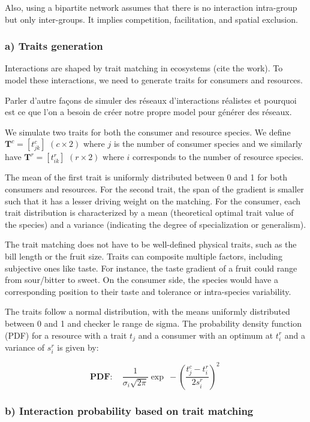 Also, using a bipartite network assumes that there is no interaction intra-group but only inter-groups. It implies competition, facilitation, and spatial exclusion.




\subsubsection{a) Traits generation}

Interactions are shaped by trait matching in ecosystems (cite the work). To model these interactions, we need to generate traits for consumers and resources.

Parler d'autre façons de simuler des réseaux d'interactions réalistes et pourquoi est ce que l'on a besoin de créer notre propre model pour générer des réseaux.

We simulate two traits for both the consumer and resource species. We define $\mathbf{T}^c = [t^c_{jk}]$ $(c \times 2)$ where $j$ is the number of consumer species and we similarly have $\mathbf{T}^r = [t^r_{ik}]$ $(r \times 2)$ where $i$ corresponds to the number of resource species.

The mean of the first trait is uniformly distributed between 0 and 1 for both consumers and resources. For the second trait, the span of the gradient is smaller such that it has a lesser  driving weight on the matching.
For the consumer, each trait distribution is characterized by a mean (theoretical optimal trait value of the species) and a variance (indicating the degree of specialization or generalism).

The trait matching does not have to be well-defined physical traits, such as the bill length or the fruit size. Traits can composite multiple factors, including subjective ones like taste. For instance, the taste gradient of a fruit could range from sour/bitter to sweet. On the consumer side, the species would have a corresponding position to their taste and tolerance or intra-species variability.

The traits follow a normal distribution, with the means uniformly distributed between 0 and 1 and checker le range de sigma. The probability density function (PDF) for a resource with a trait $t_j$ and a consumer with an optimum at $t_i^r$ and a variance of $s_i^r$ is given by:

$$
    \mathbf{PDF:} \quad \frac{1}{\sigma_i\sqrt{2\pi}} \exp\ -\left(\frac{t_j^c-t_i^r}{2s_i^r}\right)^{\!2}\
$$

\subsubsection{b) Interaction probability based on trait matching}

